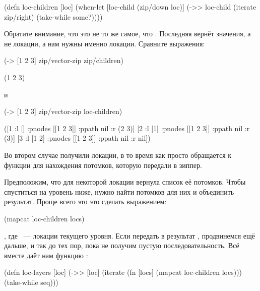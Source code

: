\begin{english}
  \begin{clojure}
(defn loc-children [loc]
  (when-let [loc-child (zip/down loc)]
    (->> loc-child
         (iterate zip/right)
         (take-while some?))))
  \end{clojure}
\end{english}

Обратите внимание, что это не то же самое, что . Последняя вернёт
значения, а не локации, а нам нужны именно локации. Сравните выражения:

\begin{english}
  \begin{clojure}
(-> [1 2 3]
    zip/vector-zip
    zip/children)

(1 2 3)
  \end{clojure}
\end{english}

\noindent
и

\begin{english}
  \begin{clojure}
(-> [1 2 3]
    zip/vector-zip
    loc-children)

([1 {:l [] :pnodes [[1 2 3]] :ppath nil :r (2 3)}]
 [2 {:l [1] :pnodes [[1 2 3]] :ppath nil :r (3)}]
 [3 {:l [1 2] :pnodes [[1 2 3]] :ppath nil :r nil}])
  \end{clojure}
\end{english}

Во втором случае получили локации, в то время как  просто
обращается к функции для нахождения потомков, которую передали в зиппер.

Предположим, что для некоторой локации  вернула список её
потомков. Чтобы спуститься на уровень ниже, нужно найти потомков для них и
объединить результат. Проще всего это это сделать выражением:

\begin{english}
  \begin{clojure}
(mapcat loc-children locs)
  \end{clojure}
\end{english}

\noindent
, где ~--- локации текущего уровня. Если передать в  результат
, продвинемся ещё дальше, и так до тех пор, пока не получим пустую
последовательность. Всё вместе даёт нам функцию :

\begin{english}
  \begin{clojure}
(defn loc-layers [loc]
  (->> [loc]
       (iterate (fn [locs]
                  (mapcat loc-children locs)))
       (take-while seq)))
  \end{clojure}
\end{english}

